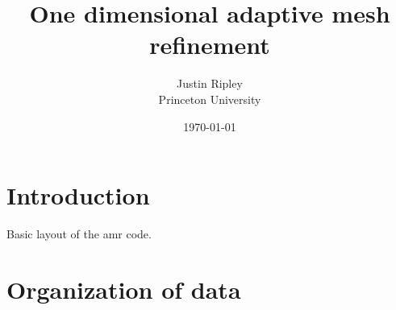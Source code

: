 \documentclass[10pt,letter]{article}
\begin{document}
\title{One dimensional adaptive mesh refinement}    
\author{Justin Ripley
	\\Princeton University}
\date{\today}
 
\maketitle 
     
\section{Introduction}
       Basic layout of the amr code.  

\section{Organization of data}
\end{document}
